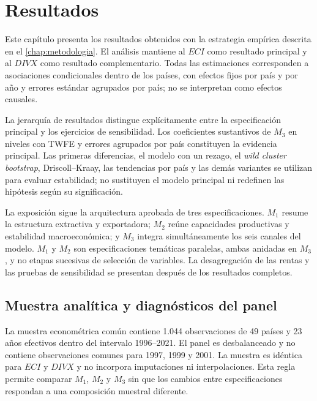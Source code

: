 \documentclass[../../TFM.tex]{subfiles}
\begin{document}

\chapter{Resultados}
\label{chap:resultados}

Este capítulo presenta los resultados obtenidos con la estrategia empírica
descrita en el \autoref{chap:metodologia}. El análisis mantiene al $ECI$ como resultado principal y al $DIVX$ como resultado complementario. Todas las
estimaciones corresponden a asociaciones condicionales dentro de los países,
con efectos fijos por país y por año y errores estándar agrupados por país; no
se interpretan como efectos causales.

La jerarquía de resultados distingue explícitamente entre la especificación
principal y los ejercicios de sensibilidad. Los coeficientes sustantivos de
$M_3$ en niveles con TWFE y errores agrupados por país constituyen la evidencia
principal. Las primeras diferencias, el modelo con un rezago, el
\textit{wild cluster bootstrap}, Driscoll--Kraay, las tendencias por país y las
demás variantes se utilizan para evaluar estabilidad; no sustituyen el modelo
principal ni redefinen las hipótesis según su significación.

La exposición sigue la arquitectura aprobada de tres especificaciones. $M_1$
resume la estructura extractiva y exportadora; $M_2$ reúne capacidades
productivas y estabilidad macroeconómica; y $M_3$ integra simultáneamente los
seis canales del modelo. $M_1$ y $M_2$ son especificaciones temáticas paralelas,
ambas anidadas en $M_3$, y no etapas sucesivas de selección de variables. La
desagregación de las rentas y las pruebas de sensibilidad se presentan después
de los resultados completos.


\section{Muestra analítica y diagnósticos del panel}
\label{sec:resultados-muestra-diagnosticos}

La muestra econométrica común contiene 1.044 observaciones de 49 países y 23
años efectivos dentro del intervalo 1996--2021. El panel es desbalanceado y no
contiene observaciones comunes para 1997, 1999 y 2001. La muestra es idéntica
para $ECI$ y $DIVX$ y no incorpora imputaciones ni interpolaciones. Esta regla
permite comparar $M_1$, $M_2$ y $M_3$ sin que los cambios entre especificaciones
respondan a una composición muestral diferente.
\end{document}
